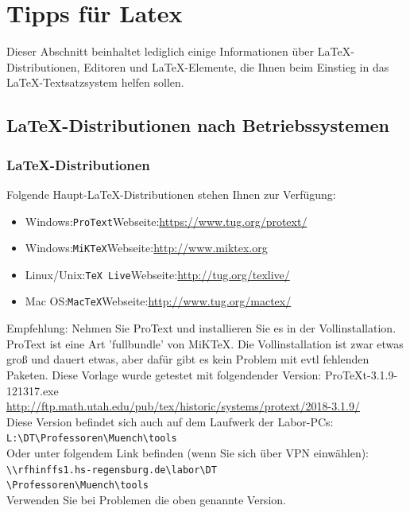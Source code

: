 \documentclass[conference]{IEEEtran}
\begin{document}
\section*{Tipps für Latex}
Dieser Abschnitt beinhaltet lediglich einige Informationen über \LaTeX-Distributionen, Editoren und \LaTeX-Elemente, die Ihnen beim Einstieg in das \LaTeX-Textsatzsystem helfen sollen.

\subsection{\LaTeX-Distributionen nach Betriebssystemen}

\subsubsection{\LaTeX-Distributionen}
Folgende Haupt-\LaTeX-Distributionen stehen Ihnen zur Verfügung:
\begin{itemize}
  \item Windows:\quad \texttt{ProText}\quad Webseite:\quad\url{https://www.tug.org/protext/}    
  \item Windows:\quad \texttt{MiKTeX}\quad Webseite:\quad\url{http://www.miktex.org}
  \item Linux/Unix:\quad \texttt{TeX Live}\quad Webseite:\quad\url{http://tug.org/texlive/}
  \item Mac OS:\quad \texttt{MacTeX}\quad Webseite:\quad\url{http://www.tug.org/mactex/}
\end{itemize}
Empfehlung: Nehmen Sie ProText und installieren Sie es in der Vollinstallation. ProText ist eine Art 'fullbundle' von MiKTeX. Die Vollinstallation ist zwar etwas groß und dauert etwas, aber dafür gibt es kein Problem mit evtl fehlenden Paketen.
Diese Vorlage wurde getestet mit folgendender Version:
ProTeXt-3.1.9-121317.exe \\ 
\url{http://ftp.math.utah.edu/pub/tex/historic/systems/protext/2018-3.1.9/} \\
Diese Version befindet sich auch auf dem Laufwerk der Labor-PCs:\\
\verb|L:\DT\Professoren\Muench\tools| \\  
Oder unter folgendem Link befinden (wenn Sie sich über VPN einwählen): \\
\verb|\\rfhinffs1.hs-regensburg.de\labor\DT|\\ \verb|\Professoren\Muench\tools|\\
Verwenden Sie bei Problemen die oben genannte Version.
\end{document}
